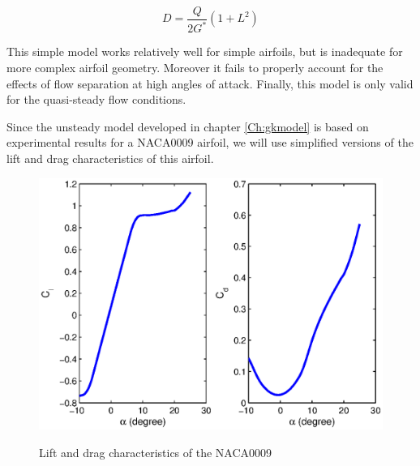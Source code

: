\begin{equation}
D=\frac{Q}{2G^*}(1+L^2)
\label{eqn:Lissaman_G}
\end{equation}


\par This simple model works relatively well for simple airfoils, but is inadequate for more complex airfoil geometry.
Moreover it fails to properly account for the effects of flow separation at high angles of attack.
Finally, this model is only valid for the quasi-steady flow conditions.

\par Since the unsteady model developed in chapter \ref{Ch:gkmodel} is based on experimental results for a NACA0009 airfoil, we will use simplified versions of the lift and drag characteristics of this airfoil.

\begin{figure}[ht]
\begin{center}
  \scalebox{1.0}
  {\includegraphics{./Figures/NACA0009_steady_map_Cl_Cd.eps}} 
\end{center}
\caption{Lift and drag characteristics of the NACA0009}
\end{figure}



